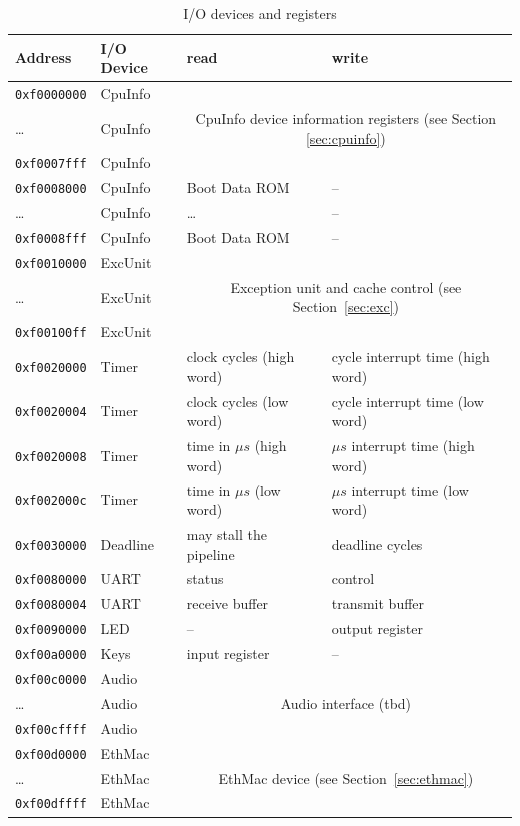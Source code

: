 \documentclass[a4paper,fontsize=10pt,twoside,DIV15,BCOR12mm,headinclude=true,footinclude=false,pagesize,bibtotoc]{scrbook}
\newcommand{\code}[1]{{\texttt{#1}}}
\begin{document}
\begin{table}
\centering
\begin{tabular}{llll}
\toprule
Address & I/O Device & read & write \\
\midrule
\code{0xf0000000} & CpuInfo & & \\
\dots             & CpuInfo & \multicolumn{2}{c}{CpuInfo device information registers (see Section \ref{sec:cpuinfo})} \\
\code{0xf0007fff} & CpuInfo & & \\
\code{0xf0008000} & CpuInfo & Boot Data ROM & -- \\
\dots             & CpuInfo & \dots    & -- \\
\code{0xf0008fff} & CpuInfo & Boot Data ROM & -- \\
\cmidrule{1-4}
\code{0xf0010000} & ExcUnit & &  \\
\dots             & ExcUnit & \multicolumn{2}{c}{Exception unit and cache control (see Section~\ref{sec:exc})} \\
\code{0xf00100ff} & ExcUnit & & \\
\cmidrule{1-4}
\code{0xf0020000} & Timer & clock cycles (high word) & cycle interrupt time (high word) \\
\code{0xf0020004} & Timer & clock cycles (low word) & cycle interrupt time (low word) \\
\code{0xf0020008} & Timer & time in $\mu s$ (high word) & $\mu s$ interrupt time (high word) \\
\code{0xf002000c} & Timer & time in $\mu s$ (low word) &  $\mu s$ interrupt time (low word) \\
\cmidrule{1-4}
\code{0xf0030000} & Deadline & may stall the pipeline & deadline cycles \\
\cmidrule{1-4}
\code{0xf0080000} & UART & status & control \\
\code{0xf0080004} & UART & receive buffer & transmit buffer \\
\cmidrule{1-4}
\code{0xf0090000} & LED & -- & output register \\
\cmidrule{1-4}
\code{0xf00a0000} & Keys & input register & -- \\
\cmidrule{1-4}
\code{0xf00c0000} & Audio & & \\
\dots             & Audio & \multicolumn{2}{c}{Audio interface (tbd)} \\
\code{0xf00cffff} & Audio & & \\
\cmidrule{1-4}
\code{0xf00d0000} & EthMac & & \\
\dots             & EthMac & \multicolumn{2}{c}{EthMac device (see Section~\ref{sec:ethmac})} \\
\code{0xf00dffff} & EthMac & & \\
\bottomrule
\end{tabular}
\caption{I/O devices and registers}
\label{tab:iomap}
\end{table}
\end{document}

